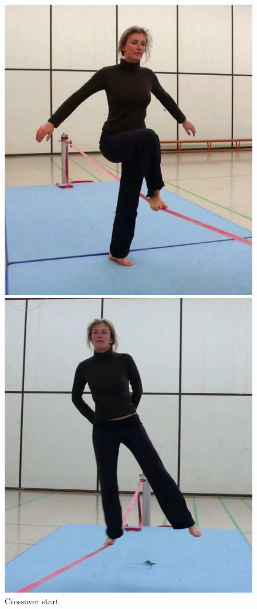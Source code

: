 \begin{figure}[htb]
	\centering
	\begin{minipage}[t]{0.28\linewidth}
		\centering
		\includegraphics[width=1\linewidth]{Pictures/slacklineAdvancedCrossoverStart}
		\caption{Crossover start \cite{Kroiss2007-ab}}
		\label{fig:slacklineAdvancedCrossoverStart}
	\end{minipage}	
	\hfill
	\begin{minipage}[t]{0.3\linewidth}
		\centering
		\includegraphics[width=0.9\linewidth]{Pictures/slacklineAdvancedHandsBehindBack}

\end{minipage}
\end{figure}
